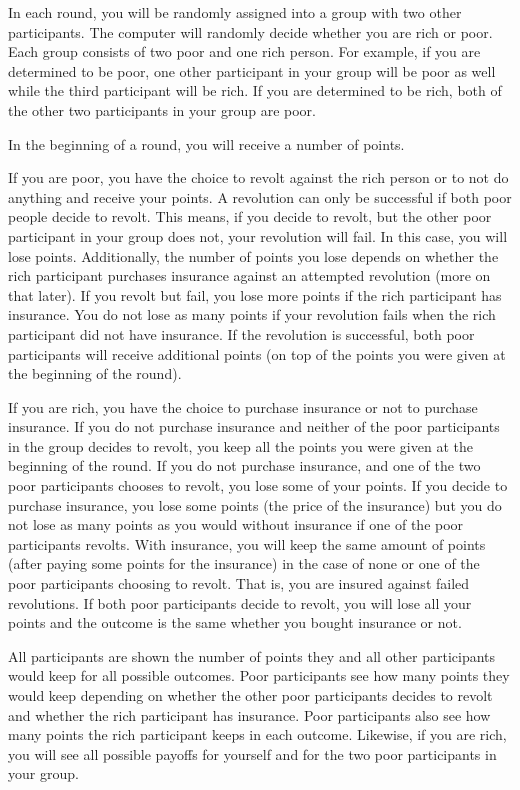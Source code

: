 \documentclass[12pt]{article}
\begin{document}
	In each round, you will be randomly assigned into a group with two other 
	participants. The computer will randomly decide whether you are rich or 
	poor. Each group consists of two poor and one rich person. For example, if 
	you are determined to be poor, one other participant in your group will be 
	poor as well while the third participant will be rich. If you are 
	determined to be rich, both of the other two participants in your group are 
	poor.
	
	In the beginning of a round, you will receive a number of points.
	
	If you are poor, you have the choice to revolt against the rich person or 
	to not do anything and receive your points. A revolution 
	can only be successful if both poor people decide to revolt. This means, if 
	you decide to revolt, but the other poor participant in your group does 
	not, your revolution will fail. In this case, you will lose points. 
	Additionally, the number of 
	points you lose depends on whether the rich participant purchases 
	insurance against an attempted revolution (more on that later). If you 
	revolt but fail, you lose more points if the rich participant has 
	insurance. You do not lose as many points if your revolution fails when the 
	rich participant did not have insurance.
	If the revolution is successful, both poor participants will receive 
	additional points (on top of the points you were given at the beginning of 
	the round). 
	
	If you are rich, you have the choice to purchase insurance or not to 
	purchase insurance. If you do not purchase insurance and neither of the 
	poor participants in the group decides to revolt, you keep all the points 
	you were given at the beginning of the round. If you do not purchase 
	insurance, and one of the two poor participants chooses to revolt, you lose 
	some of your points. If you decide to purchase insurance, you lose some 
	points (the price of the insurance) but you do not lose as many points as 
	you would without insurance if one of the poor participants revolts. With 
	insurance, you will keep the same amount of points (after paying some 
	points for the insurance) in the case of none or one of the poor 
	participants choosing to revolt. That is, you are insured against failed 
	revolutions. If both poor participants decide to revolt, you will lose all 
	your points and the outcome is the same whether you bought insurance or not.
	
	All participants are shown the number of points they and all other 
	participants would keep for all possible outcomes. Poor participants see 
	how many points they would keep depending on whether the other poor 
	participants decides to revolt and whether the rich participant has 
	insurance. Poor participants also see how many points the rich participant 
	keeps in each outcome. Likewise, if you are rich, you will see all possible 
	payoffs for yourself and for the two poor participants in your group.
	
\end{document}
